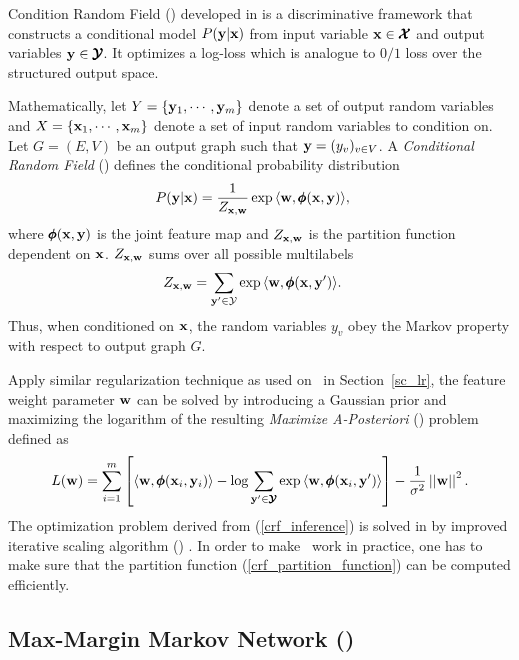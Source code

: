 {Condition Random Field (\crf) developed in \citep{lafferty01,taskar02} is a discriminative framework that constructs a conditional model $P(\mathbf {y}|\mathbf {x})$ from input variable $\mathbf {x}\in\pmb {\mathcal{X}}$ and output variables $\mathbf {y}\in\pmb {\mathcal{Y}}$.
It optimizes a log-loss which is analogue to $0/1$ loss over the structured output space.

Mathematically, let $Y=\{\mathbf {y}_1,\cdots,\mathbf {y}_m\}$ denote a set of output random variables and $X=\{\mathbf {x}_1,\cdots,\mathbf {x}_m\}$ denote a set of input random variables to condition on.
Let $G=(E,V)$ be an output graph such that $\mathbf {y} = (y_v)_{v\in V}$.
A \textit{Conditional Random Field} (\crf) defines the conditional probability distribution
\begin{align*}
	P(\mathbf {y}|\mathbf {x}) &= \frac{1}{Z_{\mathbf {x},\mathbf {w}}}\exp{\langle \mathbf {w}, \pmb \phi(\mathbf {x},\mathbf {y}) \rangle},
\end{align*}
where $\pmb \phi(\mathbf {x},\mathbf {y})$ is the joint feature map and $Z_{\mathbf {x},\mathbf {w}}$ is the partition function dependent on $\mathbf {x}$.
$Z_{\mathbf {x},\mathbf {w}}$ sums over all possible multilabels 
\begin{align}
	Z_{\mathbf {x},\mathbf {w}} &= \sum_{\mathbf {y}'\in\mathcal{Y}}\exp{\langle \mathbf {w}, \pmb \phi(\mathbf {x},\mathbf {y}') \rangle}. \label{crf_partition_function}
\end{align}
Thus, when conditioned on $\mathbf {x}$, the random variables $y_v$ obey the Markov property with respect to output graph $G$.

Apply similar regularization technique as used on \lr\ in Section~\ref{sc_lr}, the feature weight parameter $\mathbf {w}$ can be solved by introducing a Gaussian prior and maximizing the logarithm of the resulting \textit{Maximize A-Posteriori} (\map) problem \citep{taskar02} defined as
\begin{align}
	L(\mathbf {w}) = \sum_{i=1}^{m}\left[\langle \mathbf {w}, \pmb \phi(\mathbf {x}_i,\mathbf {y}_i) \rangle-\log{\sum_{\mathbf {y}'\in\pmb {\mathcal{Y}}}{\exp{\langle \mathbf {w}, \pmb \phi(\mathbf {x}_i,\mathbf {y}') \rangle}}}\right] - \frac{1}{\sigma^2}\left|\left| \mathbf {w} \right|\right|^2. \label{crf_inference}
\end{align}
The optimization problem derived from (\ref{crf_inference}) is solved in \citep{lafferty01} by improved iterative scaling algorithm (\iis) \citep{Pietra97inducing}.
In order to make \crf\ work in practice, one has to make sure that the partition function (\ref{crf_partition_function}) can be computed efficiently.



%
% 
\subsection{Max-Margin Markov Network (\mmmn)} \label{sc_mmmn}

}
